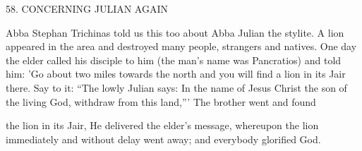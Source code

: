 58. CONCERNING JULIAN AGAIN

Abba Stephan Trichinas told us this too about Abba Julian the
stylite. A lion appeared in the area and destroyed many people,
strangers and natives. One day the elder called his disciple to him
(the man's name was Pancratios) and told him: 'Go about two miles
towards the north and you will find a lion in its Jair there. Say to it:
“The lowly Julian says: In the name of Jesus Christ the son of the
living God, withdraw from this land,”' The brother went and found

the lion in its Jair, He delivered the elder's message, whereupon the
lion immediately and without delay went away; and everybody
glorified God.

